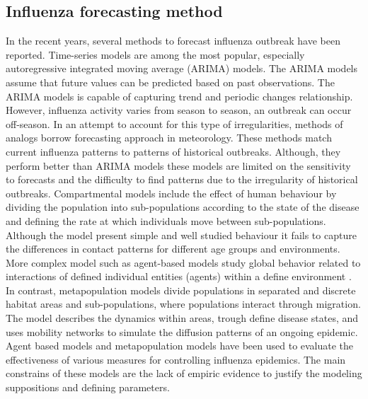 \documentclass[12pt]{article}
\begin{document}
\subsection{Influenza forecasting method}

In the recent years, several  methods to forecast influenza outbreak have been reported\autocite{nsoesie2014}. Time-series models are among the most popular, especially  autoregressive integrated moving average (ARIMA) models. The ARIMA models assume that future values can be predicted based on past observations\autocite{quenel1998}. The ARIMA models is capable of capturing trend and periodic changes relationship. However, influenza activity varies from season to season, an outbreak can occur off-season. In an attempt to account for this type of irregularities, methods of analogs borrow forecasting approach in meteorology. These methods match current influenza patterns to patterns of historical outbreaks\autocite{viboud2003}. Although, they perform better than ARIMA models these models are limited on the sensitivity to forecasts and the difficulty to find patterns due to the irregularity of historical outbreaks. Compartmental models include the effect of human behaviour by dividing the population into sub-populations according to the state of the disease and defining the rate at which individuals move between sub-populations. Although the model present simple and well studied behaviour it fails to capture the differences in contact patterns for different age groups and environments\autocite{degli2008}. More complex model such as agent-based models study global behavior related to interactions of defined individual entities (agents) within a define environment \autocite{carrasco2013}. In contrast, metapopulation models divide populations in separated and discrete habitat areas and sub-populations, where populations interact through migration. The model describes the dynamics within areas, trough define disease states, and uses mobility networks to simulate the diffusion patterns of an ongoing epidemic. Agent based models and metapopulation models have been used to evaluate the effectiveness of various measures for controlling influenza epidemics. The main constrains of these models are the lack of empiric evidence to justify the modeling suppositions and defining parameters\autocite{nsoesie2014}.
\end{document}
